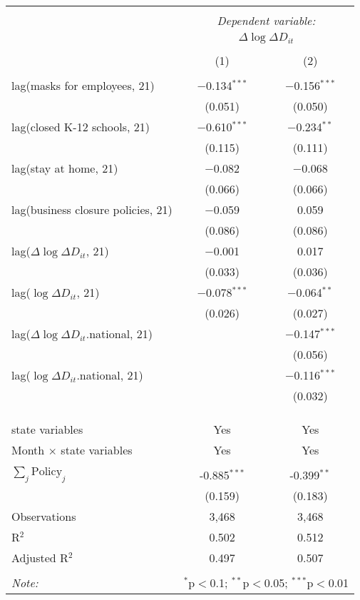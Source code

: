 \begin{tabular}{@{\extracolsep{1pt}}lcc} 
\\[-1.8ex]\hline 
\hline \\[-1.8ex] 
 & \multicolumn{2}{c}{\textit{Dependent variable:}} \\ 
\cline{2-3} 
 & \multicolumn{2}{c}{$\Delta \log \Delta D_{it}$} \\ 
\\[-1.8ex] & (1) & (2)\\ 
\hline \\[-1.8ex] 
 lag(masks for employees, 21) & $-$0.134$^{***}$ & $-$0.156$^{***}$ \\ 
  & (0.051) & (0.050) \\ 
  lag(closed K-12 schools, 21) & $-$0.610$^{***}$ & $-$0.234$^{**}$ \\ 
  & (0.115) & (0.111) \\ 
  lag(stay at home, 21) & $-$0.082 & $-$0.068 \\ 
  & (0.066) & (0.066) \\ 
  lag(business closure policies, 21) & $-$0.059 & 0.059 \\ 
  & (0.086) & (0.086) \\ 
  lag($\Delta \log \Delta D_{it}$, 21) & $-$0.001 & 0.017 \\ 
  & (0.033) & (0.036) \\ 
  lag($\log \Delta D_{it}$, 21) & $-$0.078$^{***}$ & $-$0.064$^{**}$ \\ 
  & (0.026) & (0.027) \\ 
  lag($\Delta \log \Delta D_{it}$.national, 21) &  & $-$0.147$^{***}$ \\ 
  &  & (0.056) \\ 
  lag($\log \Delta D_{it}$.national, 21) &  & $-$0.116$^{***}$ \\ 
  &  & (0.032) \\ 
   &  &  \\ 
  &  &  \\ 
 \hline \\[-1.8ex] 
state variables & Yes & Yes \\ 
Month $\times$ state variables & Yes & Yes \\ 
\hline \\[-1.8ex] 
$\sum_j \mathrm{Policy}_j$ & -0.885$^{***}$ & -0.399$^{**}$ \\ 
 & (0.159) & (0.183) \\ 
Observations & 3,468 & 3,468 \\ 
R$^{2}$ & 0.502 & 0.512 \\ 
Adjusted R$^{2}$ & 0.497 & 0.507 \\ 
\hline 
\hline \\[-1.8ex] 
\textit{Note:}  & \multicolumn{2}{r}{$^{*}$p$<$0.1; $^{**}$p$<$0.05; $^{***}$p$<$0.01} \\ 
\end{tabular} 